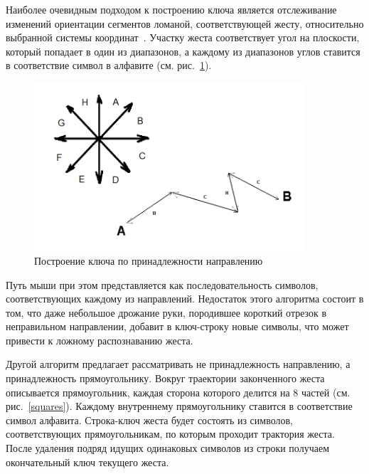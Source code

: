 \documentclass[a5paper]{article}
\begin{document}
Наиболее очевидным подходом к построению ключа является отслеживание изменений ориентации сегментов ломаной, соответствующей жесту, относительно выбранной системы координат~\cite{chaosAlgorithm}. Участку жеста соответствует угол на плоскости, который попадает в один из диапазонов, а каждому из диапазонов углов ставится в соответствие символ в алфавите (см. рис.~\ref{chaos}). 

\begin{figure} [ht]
  \begin{center}
    \includegraphics[width=0.9\textwidth, bb=0 0 804 498]{02-chaos.png}
    \caption{Построение ключа по принадлежности направлению}
    \label{chaos}
  \end{center}
\end{figure}

Путь мыши при этом представляется как последовательность символов, соответствующих каждому из направлений. Недостаток этого алгоритма состоит в том, что даже небольшое дрожание руки, породившее короткий отрезок в неправильном направлении, добавит в ключ-строку новые символы, что может привести к ложному распознаванию жеста.

Другой алгоритм предлагает рассматривать не принадлежность направлению, а принадлежность прямоугольнику. Вокруг траектории законченного жеста описывается прямоугольник, каждая сторона которого делится на 8 частей (см. рис.~\ref{squares}). Каждому внутреннему прямоугольнику ставится в соответствие символ алфавита. Строка-ключ жеста будет состоять из символов, соответствующих прямоугольникам, по которым проходит трактория жеста. После удаления подряд идущих одинаковых символов из строки получаем окончательный ключ текущего жеста. 
\end{document}
